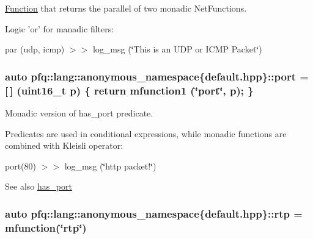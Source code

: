 \hyperlink{structpfq_1_1lang_1_1Function}{Function} that returns the parallel of two monadic Net\+Functions. 

Logic 'or' for manadic filters\+:

par (udp, icmp) $>$$>$ log\+\_\+msg (\char`\"{}\+This is an U\+D\+P or I\+C\+M\+P Packet\char`\"{}) \hypertarget{namespacepfq_1_1lang_1_1anonymous__namespace_02default_8hpp_03_a868eca03290a037cb4e9b7075085888b}{
\subsubsection[{port}]{\setlength{\rightskip}{0pt plus 5cm}auto pfq\+::lang\+::anonymous\+\_\+namespace\{default.\+hpp\}\+::port = \mbox{[}$\,$\mbox{]} (uint16\+\_\+t p) \{ return {\bf mfunction1} (\char`\"{}port\char`\"{}, p); \}}}\label{namespacepfq_1_1lang_1_1anonymous__namespace_02default_8hpp_03_a868eca03290a037cb4e9b7075085888b}


Monadic version of {\ttfamily has\+\_\+port} predicate. 

Predicates are used in conditional expressions, while monadic functions are combined with Kleisli operator\+:

port(80) $>$$>$ log\+\_\+msg (\char`\"{}http packet!\char`\"{})

\begin{DoxySeeAlso}{See also}
\hyperlink{namespacepfq_1_1lang_1_1anonymous__namespace_02default_8hpp_03_a9f7161b8dfb842c5a845f413eb6bc82f}{has\+\_\+port} 
\end{DoxySeeAlso}
\hypertarget{namespacepfq_1_1lang_1_1anonymous__namespace_02default_8hpp_03_aa8ac230fe8eeb0bccee8e31ba032cb8e}{
\subsubsection[{rtp}]{\setlength{\rightskip}{0pt plus 5cm}auto pfq\+::lang\+::anonymous\+\_\+namespace\{default.\+hpp\}\+::rtp = {\bf mfunction}(\char`\"{}rtp\char`\"{})}}\label{namespacepfq_1_1lang_1_1anonymous__namespace_02default_8hpp_03_aa8ac230fe8eeb0bccee8e31ba032cb8e}



